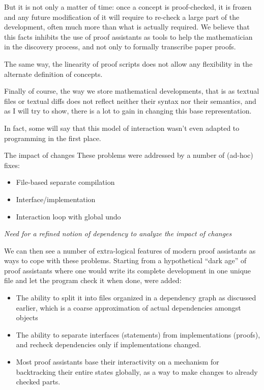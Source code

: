 \documentclass[ignorenonframetext,red]{beamer}
\begin{document}
But it is not only a matter of time: once a concept is proof-checked,
it is frozen and any future modification of it will require to
re-check a large part of the development, often much more than what is
actually required. We believe that this facts inhibits the use of
proof assistants as tools to help the mathematician in the discovery
process, and not only to formally transcribe paper proofs.

The same way, the linearity of proof scripts does not allow any
flexibility in the alternate definition of concepts.

Finally of course, the way we store mathematical developments, that is
as textual files or textual diffs does not reflect neither their syntax
nor their semantics, and as I will try to show, there is a lot to gain
in changing this base representation.

In fact, some will say that this model of interaction wasn't even
adapted to programming in the first place.

\begin{frame}{The impact of changes}
  These problems were addressed by a number of (ad-hoc) fixes:
  \begin{itemize}
  \item File-based separate compilation
  \item Interface/implementation
  \item Interaction loop with global undo
  \end{itemize}
  \vspace{2em}
  \begin{center} \Large
    \begin{spacing}{1.3}
      \textit{Need for a refined notion of dependency to analyze the
        impact of changes}
    \end{spacing}
  \end{center}
\end{frame}

We can then see a number of extra-logical features of modern proof
assistants as ways to cope with these problems. Starting from a
hypothetical ``dark age'' of proof assistants where one would write
its complete development in one unique file and let the program check
it when done, were added:
\begin{itemize}
\item The ability to split it into files organized in a dependency
  graph as discussed earlier, which is a coarse approximation of
  actual dependencies amongst objects
\item The ability to separate interfaces (statements) from
  implementations (proofs), and recheck dependencies only if
  implementations changed.
\item Most proof assistants base their interactivity on a mechanism
  for backtracking their entire states globally, as a way to make
  changes to already checked parts.
\end{itemize}
\end{document}
